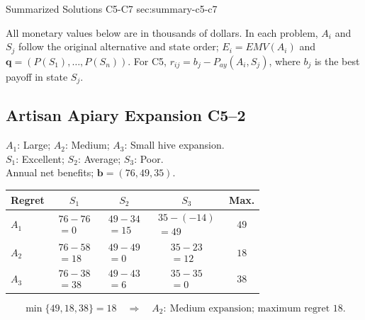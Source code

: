 \clearpage
\sectionScored
	{Summarized Solutions}
	{C5-C7}
	{sec:summary-c5-c7}
	{ \small
	All monetary values below are in thousands of dollars. In each problem,
	$A_i$ and $S_j$ follow the original alternative and state order;
	$E_i=EMV(A_i)$ and $\boldsymbol{q}=(P(S_1),\ldots,P(S_n))$.
	For C5, $r_{ij}=b_j-P_{ay}(A_i,S_j)$, where $b_j$ is the best payoff in state $S_j$.

	\subsection{Artisan Apiary Expansion \hfill C5--2}
	\noindent\begin{minipage}[t]{0.48\textwidth}
		\vspace{0pt}
		$A_1$: Large; $A_2$: Medium; $A_3$: Small hive expansion.\\
		$S_1$: Excellent; $S_2$: Average; $S_3$: Poor.\\
		Annual net benefits; $\boldsymbol{b}=(76,49,35)$.
	\end{minipage}\hfill
	\begin{minipage}[t]{0.49\textwidth}
		\vspace{0pt}\centering
		\setlength{\tabcolsep}{3pt}
		\renewcommand{\arraystretch}{1.25}
		\begin{tabular}{lcccc}\toprule
				Regret & $S_1$ & $S_2$ & $S_3$ & Max.\\ \midrule
				$A_1$&$\begin{gathered}76-76\\=0\end{gathered}$&$\begin{gathered}49-34\\=15\end{gathered}$&$\begin{gathered}35-(-14)\\=49\end{gathered}$&$49$\\
				$A_2$&$\begin{gathered}76-58\\=18\end{gathered}$&$\begin{gathered}49-49\\=0\end{gathered}$&$\begin{gathered}35-23\\=12\end{gathered}$&$18$\\
				$A_3$&$\begin{gathered}76-38\\=38\end{gathered}$&$\begin{gathered}49-43\\=6\end{gathered}$&$\begin{gathered}35-35\\=0\end{gathered}$&$38$\\ \bottomrule\end{tabular}
	\end{minipage}
	\[\min\{49,18,38\}=18
	\quad\Longrightarrow\quad \boxed{A_2:\ \text{Medium expansion; maximum regret }18.}\]

}
